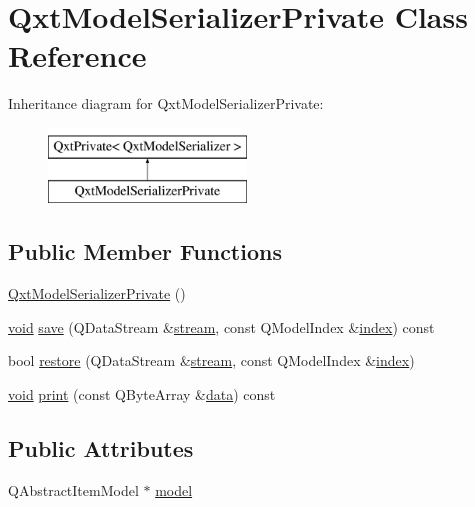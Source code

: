 \hypertarget{class_qxt_model_serializer_private}{\section{Qxt\-Model\-Serializer\-Private Class Reference}
\label{class_qxt_model_serializer_private}
}
Inheritance diagram for Qxt\-Model\-Serializer\-Private\-:\begin{figure}[H]
\begin{center}
\leavevmode
\includegraphics[height=2.000000cm]{class_qxt_model_serializer_private}
\end{center}
\end{figure}
\subsection*{Public Member Functions}
\begin{DoxyCompactItemize}
\item 
\hyperlink{class_qxt_model_serializer_private_af547768501f123740e8bc5f7b11cf19e}{Qxt\-Model\-Serializer\-Private} ()
\item 
\hyperlink{group___u_a_v_objects_plugin_ga444cf2ff3f0ecbe028adce838d373f5c}{void} \hyperlink{class_qxt_model_serializer_private_a9eebdddfc923f9b618e40770a372c0c4}{save} (Q\-Data\-Stream \&\hyperlink{ioapi_8h_a4ed0a20697a8c37f8af699a8ec6d76a8}{stream}, const Q\-Model\-Index \&\hyperlink{glext_8h_ab47dd9958bcadea08866b42bf358e95e}{index}) const 
\item 
bool \hyperlink{class_qxt_model_serializer_private_a772ec95ac322f3b45af3ccee48597300}{restore} (Q\-Data\-Stream \&\hyperlink{ioapi_8h_a4ed0a20697a8c37f8af699a8ec6d76a8}{stream}, const Q\-Model\-Index \&\hyperlink{glext_8h_ab47dd9958bcadea08866b42bf358e95e}{index})
\item 
\hyperlink{group___u_a_v_objects_plugin_ga444cf2ff3f0ecbe028adce838d373f5c}{void} \hyperlink{class_qxt_model_serializer_private_a5e8b571abde710ac04673fa3297bfb3e}{print} (const Q\-Byte\-Array \&\hyperlink{glext_8h_a8850df0785e6fbcc2351af3b686b8c7a}{data}) const 
\end{DoxyCompactItemize}
\subsection*{Public Attributes}
\begin{DoxyCompactItemize}
\item 
Q\-Abstract\-Item\-Model $\ast$ \hyperlink{class_qxt_model_serializer_private_ad6e6a6a17054079bd67cb2f37b625b8a}{model}
\end{DoxyCompactItemize}
